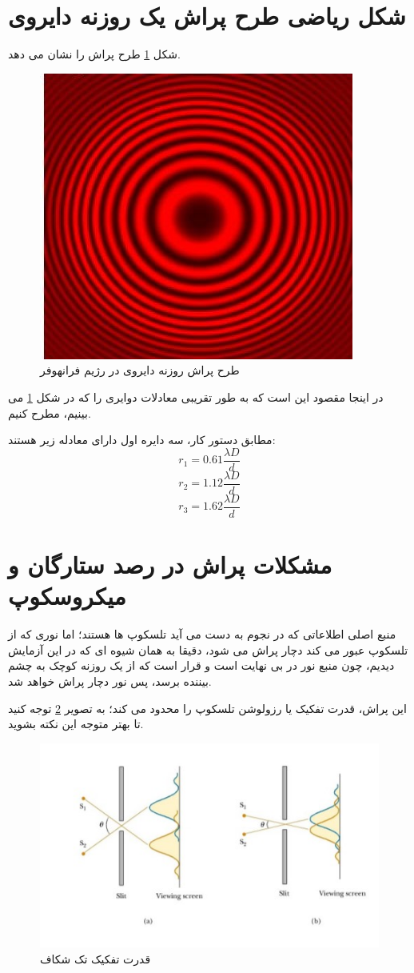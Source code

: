 \documentclass{article}
\begin{document}
\section{شکل ریاضی طرح پراش یک روزنه دایروی}
شکل
\ref{Fig2}
طرح پراش را نشان می دهد.
\begin{figure}[h]
	\centering
	\includegraphics[scale=0.5]{2.jpg}
	\caption{طرح پراش روزنه دایروی در رژیم فرانهوفر}
	\label{Fig2}
\end{figure}
در اینجا مقصود این است که به طور تقریبی معادلات دوایری را که در شکل 
\ref{Fig2}
می بینیم، مطرح کنیم.

\noindent
مطابق دستور کار، سه دایره اول دارای معادله زیر هستند:
\[
r_1 = 0.61 \frac{\lambda D}{d}
\]
\[
r_2 = 1.12 \frac{\lambda D}{d}
\]
\[
r_3 = 1.62 \frac{\lambda D}{d}
\]
\section{مشکلات پراش در رصد ستارگان و میکروسکوپ}
منبع اصلی اطلاعاتی که در نجوم به دست می آید تلسکوپ ها هستند؛ اما نوری که از تلسکوپ عبور می کند دچار پراش می شود، دقیقا به همان شیوه ای که در این آزمایش دیدیم، چون منبع نور در بی نهایت است و قرار است که از یک روزنه کوچک به چشم بیننده برسد، پس نور دچار پراش خواهد شد.

\noindent
این پراش، قدرت تفکیک یا رزولوشن تلسکوپ را محدود می کند؛ به تصویر 
\ref{Fig3}
توجه کنید تا بهتر متوجه این نکته بشوید.

\begin{figure}[h]
	\centering
	\includegraphics[scale=0.95]{3.jpg}
	\caption{قدرت تفکیک تک شکاف}
	\label{Fig3}
\end{figure}
\end{document}
